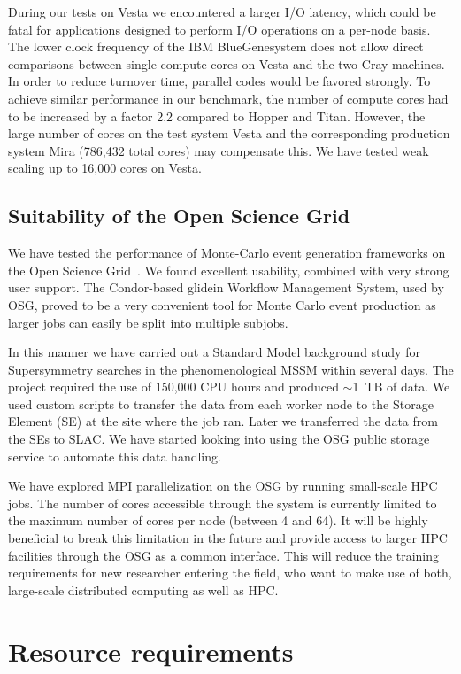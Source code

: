 During our
tests on Vesta we encountered a larger I/O latency, which could be fatal for applications
designed to perform I/O operations on a per-node basis. The lower clock frequency 
of the IBM BlueGene\registered system does not allow direct comparisons between single 
compute cores on Vesta and the two Cray machines. In order to reduce turnover time, 
parallel codes would be favored strongly. To achieve similar performance 
in our benchmark, the number of compute cores had to be increased by 
a factor 2.2 compared to Hopper and Titan. However, the large number of cores 
on the test system Vesta and the corresponding production system Mira (786,432 total cores) 
may compensate this. We have tested weak scaling up to 16,000 cores on Vesta. 

\subsection{Suitability of the Open Science Grid}
We have tested the performance of Monte-Carlo event generation frameworks
on the Open Science Grid~\cite{Altunay:2010zz,OSG}. We found excellent usability, 
combined with very strong user support. 
The Condor-based glidein Workflow Management System, used by OSG, 
proved to be a very convenient tool for Monte Carlo event production
as larger jobs can easily be split into multiple subjobs.

In this manner we have carried out a Standard Model background 
study for Supersymmetry searches in the phenomenological MSSM within several days. 
The project required the use of 150,000 CPU hours and produced $\sim$1~TB of data. 
We used custom scripts to transfer the data from each worker node to the 
Storage Element (SE) at the site where the job ran. Later we transferred 
the data from the SEs to SLAC. We have started looking into using the 
OSG public storage service to automate this data handling.

We have explored MPI parallelization on the OSG by running small-scale 
HPC jobs. The number of cores accessible through the system is currently 
limited to the maximum number of cores per node (between 4 and 64). 
It will be highly beneficial to break this limitation in the future and
provide access to larger HPC facilities through the OSG as a common
interface.  This will reduce the training requirements for new
researcher entering the field, who want to make use of both,
large-scale distributed computing as well as HPC.

\section{Resource requirements}

